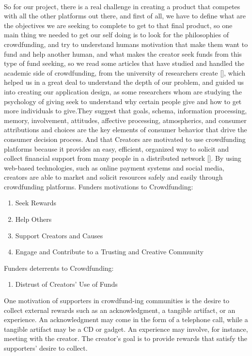 \paragraph*{}
So for our project, there is a real challenge in creating a product that competes with all the other platforms out there,
and first of all, we have to define what are the objectives we are seeking to complete to get to that final product,
so one main thing we needed to get our self doing is to look for the philosophies of crowdfunding, and try to understand humans motivation that make them want to fund and help another human, and what makes the creator seek funds from this type of fund seeking,
so we read some articles that have studied and handled the academic side of crowdfunding, from the university of  researchers create [\cite{inproceedings}], which helped us in a great deal to understand the depth of our problem, and guided us into creating our application design, as some researchers whom are studying the psychology of giving seek to understand why certain people give and how to get more individuals to give.They suggest that goals, schema, information processing, memory, involvement, attitudes, affective processing, atmospherics, and consumer attributions and choices are the key elements of consumer behavior that drive the consumer decision process.
And that Creators are motivated to use crowdfunding platforms because it provides an easy, efficient, organized way to solicit and collect financial support from many people in a distributed network [\cite{crowdMotiv}]. By using web-based technologies, such as online payment systems and social media, creators are able to market and solicit resources safely and easily through crowdfunding platforms.
Funders motivations to Crowdfunding:
\begin{enumerate}
      \item Seek Rewards
      \item Help Others
      \item Support Creators and Causes
      \item Engage and Contribute to a Trusting and Creative Community
\end{enumerate}

Funders deterrents to Crowdfunding:
\begin{enumerate}
      \item Distrust of Creators’ Use of Funds
\end{enumerate}

One motivation of supporters in crowdfund-ing communities is the desire to collect external rewards such as an acknowledgment, a tangible artifact, or an experience. An acknowledgment may come in the form of a telephone call, while a tangible artifact may be a CD or gadget. An experience may involve, for instance, meeting with the creator. The creator’s goal is to provide rewards that satisfy the supporters’ desire to collect.

